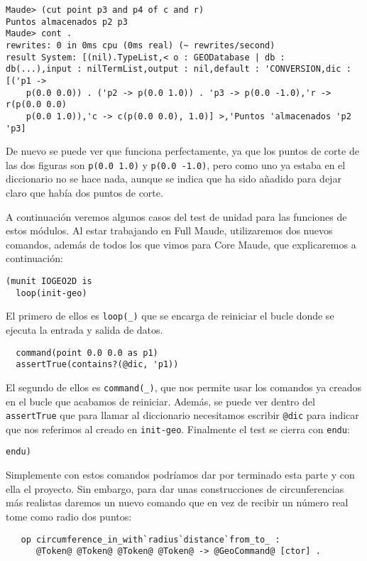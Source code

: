 {\codesize
\begin{verbatim}
Maude> (cut point p3 and p4 of c and r)
Puntos almacenados p2 p3
Maude> cont .
rewrites: 0 in 0ms cpu (0ms real) (~ rewrites/second)
result System: [(nil).TypeList,< o : GEODatabase | db : 
db(...),input : nilTermList,output : nil,default : 'CONVERSION,dic : [('p1 ->
    p(0.0 0.0)) . ('p2 -> p(0.0 1.0)) . 'p3 -> p(0.0 -1.0),'r -> r(p(0.0 0.0)
    p(0.0 1.0)),'c -> c(p(0.0 0.0), 1.0)] >,'Puntos 'almacenados 'p2 'p3]
\end{verbatim}
}

De nuevo se puede ver que funciona perfectamente, ya que los puntos de corte de las dos figuras son \verb"p(0.0 1.0)" y \verb"p(0.0 -1.0)", pero como uno ya estaba en el diccionario no se hace nada, aunque se indica que ha sido añadido para dejar claro que había dos puntos de corte.\par

A continuación veremos algunos casos del test de unidad para las funciones de estos módulos. Al estar trabajando en Full Maude, utilizaremos dos nuevos comandos, además de todos los que vimos para Core Maude, que explicaremos a continuación:
{\codesize
\begin{verbatim}
(munit IOGEO2D is
  loop(init-geo)
\end{verbatim}
}
El primero de ellos es \verb"loop(_)" que se encarga de reiniciar el bucle donde se ejecuta la entrada y salida de datos.\par
{\codesize
\begin{verbatim}
  command(point 0.0 0.0 as p1)
  assertTrue(contains?(@dic, 'p1))
\end{verbatim}
}
El segundo de ellos es \verb"command(_)", que nos permite usar los comandos ya creados en el bucle que acabamos de reiniciar. Además, se puede ver dentro del \verb"assertTrue" que para llamar al diccionario necesitamos escribir \verb"@dic" para indicar que nos referimos al creado en \verb"init-geo". Finalmente el test se cierra con \verb"endu":\par
{\codesize
\begin{verbatim}
endu)
\end{verbatim}
}

Simplemente con estos comandos podríamos dar por terminado esta parte y con ella el proyecto. Sin embargo, para dar unas construcciones de circunferencias más realistas daremos un nuevo comando que en vez de recibir un número real tome como radio  dos puntos:

{\codesize
\begin{verbatim}
   op circumference_in_with`radius`distance`from_to_ : 
      @Token@ @Token@ @Token@ @Token@ -> @GeoCommand@ [ctor] .
\end{verbatim}
}

